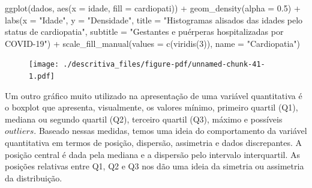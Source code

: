 \documentclass[
  letterpaper,
  DIV=11,
  numbers=noendperiod]{scrreprt}
\newenvironment{Shaded}{\begin{snugshade}}{\end{snugshade}}
\newcommand{\AttributeTok}[1]{\textcolor[rgb]{0.40,0.45,0.13}{#1}}
\newcommand{\DecValTok}[1]{\textcolor[rgb]{0.68,0.00,0.00}{#1}}
\newcommand{\FloatTok}[1]{\textcolor[rgb]{0.68,0.00,0.00}{#1}}
\newcommand{\FunctionTok}[1]{\textcolor[rgb]{0.28,0.35,0.67}{#1}}
\newcommand{\NormalTok}[1]{\textcolor[rgb]{0.00,0.23,0.31}{#1}}
\newcommand{\SpecialCharTok}[1]{\textcolor[rgb]{0.37,0.37,0.37}{#1}}
\newcommand{\StringTok}[1]{\textcolor[rgb]{0.13,0.47,0.30}{#1}}
\begin{document}
\begin{Shaded}
\begin{Highlighting}[]
\FunctionTok{ggplot}\NormalTok{(dados, }\FunctionTok{aes}\NormalTok{(}\AttributeTok{x =}\NormalTok{ idade, }\AttributeTok{fill =}\NormalTok{ cardiopati)) }\SpecialCharTok{+}
  \FunctionTok{geom\_density}\NormalTok{(}\AttributeTok{alpha =} \FloatTok{0.5}\NormalTok{) }\SpecialCharTok{+}
  \FunctionTok{labs}\NormalTok{(}\AttributeTok{x =} \StringTok{"Idade"}\NormalTok{, }\AttributeTok{y =} \StringTok{"Densidade"}\NormalTok{, }\AttributeTok{title =} \StringTok{"Histogramas alisados das idades pelo status de cardiopatia"}\NormalTok{, }\AttributeTok{subtitle =} \StringTok{"Gestantes e puérperas hospitalizadas por COVID{-}19"}\NormalTok{) }\SpecialCharTok{+}
  \FunctionTok{scale\_fill\_manual}\NormalTok{(}\AttributeTok{values =} \FunctionTok{c}\NormalTok{(}\FunctionTok{viridis}\NormalTok{(}\DecValTok{3}\NormalTok{)), }\AttributeTok{name =} \StringTok{"Cardiopatia"}\NormalTok{)}
\end{Highlighting}
\end{Shaded}

\begin{figure}[H]

{\centering \texttt{[image: ./descritiva\_files/figure-pdf/unnamed-chunk-41-1.pdf]}

}

\end{figure}

Um outro gráfico muito utilizado na apresentação de uma variável
quantitativa é o boxplot que apresenta, visualmente, os valores mínimo,
primeiro quartil (Q1), mediana ou segundo quartil (Q2), terceiro quartil
(Q3), máximo e possíveis \(outliers\). Baseado nessas medidas, temos uma
ideia do comportamento da variável quantitativa em termos de posição,
dispersão, assimetria e dados discrepantes. A posição central é dada
pela mediana e a dispersão pelo intervalo interquartil. As posições
relativas entre Q1, Q2 e Q3 nos dão uma ideia da simetria ou assimetria
da distribuição.
\end{document}
